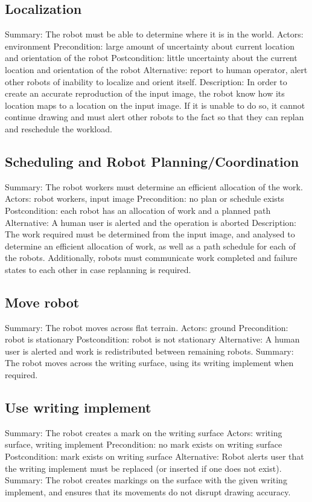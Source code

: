 \subsection{Localization}
Summary: The robot must be able to determine where it is in the world.
Actors: environment
Precondition: large amount of uncertainty about current location and orientation of the robot
Postcondition: little uncertainty about the current location and orientation of the robot
Alternative: report to human operator, alert other robots of inability to localize and orient itself.
Description: In order to create an accurate reproduction of the input image, the robot know how its location maps to a location on the input image. If it is unable to do so, it cannot continue drawing and must alert other robots to the fact so that they can replan and reschedule the workload.

\subsection{Scheduling and Robot Planning/Coordination}
Summary: The robot workers must determine an efficient allocation of the work.
Actors: robot workers, input image
Precondition: no plan or schedule exists
Postcondition: each robot has an allocation of work and a planned path
Alternative: A human user is alerted and the operation is aborted
Description: The work required must be determined from the input image, and analysed to determine an efficient allocation of work, as well as a path schedule for each of the robots. Additionally, robots must communicate work completed and failure states to each other in case replanning is required.

\subsection{Move robot}
Summary: The robot moves across flat terrain.
Actors: ground
Precondition: robot is stationary
Postcondition: robot is not stationary
Alternative: A human user is alerted and work is redistributed between remaining robots.
Summary: The robot moves across the writing surface, using its writing implement when required.

\subsection{Use writing implement}
Summary: The robot creates a mark on the writing surface
Actors: writing surface, writing implement
Precondition: no mark exists on writing surface
Postcondition: mark exists on writing surface
Alternative: Robot alerts user that the writing implement must be replaced (or inserted if one does not exist).
Summary: The robot creates markings on the surface with the given writing implement, and ensures that its movements do not disrupt drawing accuracy.

